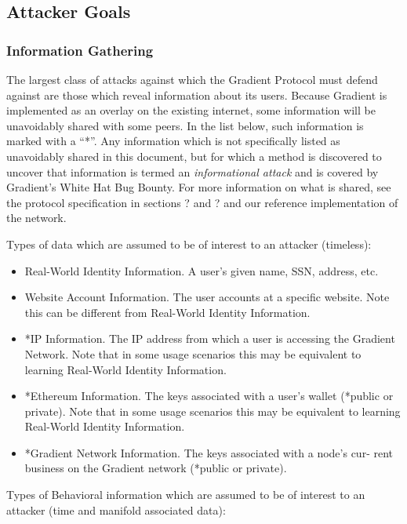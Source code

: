 \documentclass{article}
\begin{document}
\subsection{Attacker Goals}

\subsubsection{Information Gathering}

The largest class of attacks against which the Gradient Protocol must defend against are those which reveal information about its users. Because Gradient is implemented as an overlay on the existing internet, some information will be unavoidably shared with some peers. In the list below, such information is marked with a “*”. Any information which is not specifically listed as unavoidably shared in this document, but for which a method is discovered to uncover that information is termed an \emph{informational attack} and is covered by Gradient’s White Hat Bug Bounty. For more information on what is shared, see the protocol specification in sections ? and ? and our reference implementation of the network.

Types of data which are assumed to be of interest to an attacker (timeless):

\begin{itemize}
    \item Real-World Identity Information. A user’s given name, SSN, address, etc.
    \item Website Account Information. The user accounts at a specific website. Note this can be different from Real-World Identity Information.
    \item *IP Information. The IP address from which a user is accessing the Gradient Network. Note that in some usage scenarios this may be equivalent to learning Real-World Identity Information.
    \item *Ethereum Information. The keys associated with a user’s wallet (*public or private). Note that in some usage scenarios this may be equivalent to learning Real-World Identity Information.
    \item *Gradient Network Information. The keys associated with a node’s cur- rent business on the Gradient network (*public or private).
\end{itemize}

Types of Behavioral information which are assumed to be of interest to an attacker (time and manifold associated data):
\end{document}
